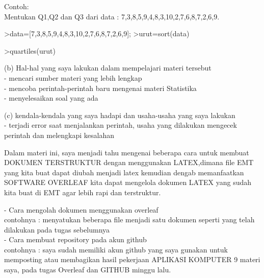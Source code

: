 \documentclass[a4paper,10pt]{article}
\begin{document}
\begin{eulernotebook}
\begin{eulercomment}
\begin{eulercomment}
\begin{eulercomment}
Contoh:\\
Mentukan Q1,Q2 dan Q3 dari data : 7,3,8,5,9,4,8,3,10,2,7,6,8,7,2,6,9.
\end{eulercomment}
\begin{eulerprompt}
>data=[7,3,8,5,9,4,8,3,10,2,7,6,8,7,2,6,9];
>urut=sort(data)
\end{eulerprompt}
\begin{euleroutput}
  [2,  2,  3,  3,  4,  5,  6,  6,  7,  7,  7,  8,  8,  8,  9,  9,  10]
\end{euleroutput}
\begin{eulerprompt}
>quartiles(urut)
\end{eulerprompt}
\begin{euleroutput}
  [2,  3.5,  7,  8,  10]
\end{euleroutput}
\begin{eulercomment}
(b) Hal-hal yang saya lakukan dalam mempelajari materi tersebut\\
- mencari sumber materi yang lebih lengkap\\
- mencoba perintah-perintah baru mengenai materi Statistika\\
- menyelesaikan soal yang ada

(c) kendala-kendala yang saya hadapi dan usaha-usaha yang saya lakukan\\
- terjadi error saat menjalankan perintah, usaha yang dilakukan
mengecek perintah dan melengkapi kesalahan
\end{eulercomment}
\begin{eulercomment}

\end{eulercomment}
\eulersubheading{}
\eulersubheading{}
\begin{eulercomment}
Dalam materi ini, saya menjadi tahu mengenai beberapa cara untuk membuat DOKUMEN TERSTRUKTUR
dengan menggunakan LATEX,dimana file EMT yang kita buat dapat diubah menjadi latex kemudian
dengab memanfaatkan SOFTWARE OVERLEAF kita dapat mengelola dokumen LATEX yang sudah kita buat
di EMT agar lebih rapi dan terstruktur.

- Cara mengolah dokumen menggunakan overleaf\\
contohnya : menyatukan beberapa file menjadi satu dokumen seperti yang telah dilakukan pada
tugas sebelumnya\\
- Cara membuat repository pada akun github\\
contohnya : saya sudah memiliki akun github yang saya gunakan untuk memposting atau
membagikan hasil pekerjaan APLIKASI KOMPUTER 9 materi saya, pada tugas Overleaf dan GITHUB
minggu lalu.



\end{eulercomment}
\end{eulercomment}
\end{eulercomment}
\end{eulernotebook}
\end{document}
